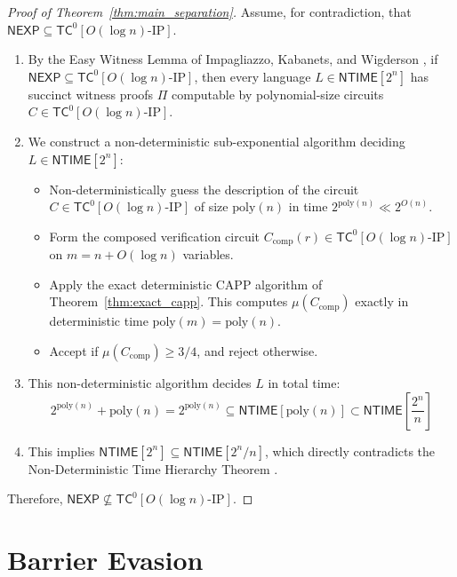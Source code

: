 \documentclass[11pt,letterpaper]{article}
\newcommand{\NEXP}{\mathsf{NEXP}}
\newcommand{\NTIME}{\mathsf{NTIME}}
\newcommand{\TC}{\mathsf{TC}}
\newcommand{\poly}{\mathrm{poly}}
\begin{document}
\begin{proof}[Proof of Theorem~\ref{thm:main_separation}]
Assume, for contradiction, that $\NEXP \subseteq \TC^0[O(\log n)\text{-}\mathrm{IP}]$.
\begin{enumerate}
    \item By the Easy Witness Lemma of Impagliazzo, Kabanets, and Wigderson \cite{IKW02}, if $\NEXP \subseteq \TC^0[O(\log n)\text{-}\mathrm{IP}]$, then every language $L \in \NTIME[2^n]$ has succinct witness proofs $\Pi$ computable by polynomial-size circuits $C \in \TC^0[O(\log n)\text{-}\mathrm{IP}]$.
    \item We construct a non-deterministic sub-exponential algorithm deciding $L \in \NTIME[2^n]$:
    \begin{itemize}
        \item Non-deterministically guess the description of the circuit $C \in \TC^0[O(\log n)\text{-}\mathrm{IP}]$ of size $\poly(n)$ in time $2^{\poly(n)} \ll 2^{O(n)}$.
        \item Form the composed verification circuit $C_{\mathrm{comp}}(r) \in \TC^0[O(\log n)\text{-}\mathrm{IP}]$ on $m = n + O(\log n)$ variables.
        \item Apply the exact deterministic CAPP algorithm of Theorem~\ref{thm:exact_capp}. This computes $\mu(C_{\mathrm{comp}})$ exactly in deterministic time $\poly(m) = \poly(n)$.
        \item Accept if $\mu(C_{\mathrm{comp}}) \ge 3/4$, and reject otherwise.
    \end{itemize}
    \item This non-deterministic algorithm decides $L$ in total time:
    \[
    2^{\poly(n)} + \poly(n) = 2^{\poly(n)} \subseteq \NTIME[\poly(n)] \subset \NTIME\left[\frac{2^n}{n}\right]
    \]
    \item This implies $\NTIME[2^n] \subseteq \NTIME[2^n / n]$, which directly contradicts the Non-Deterministic Time Hierarchy Theorem \cite{Coo72,Zak83}.
\end{enumerate}
Therefore, $\NEXP \not\subseteq \TC^0[O(\log n)\text{-}\mathrm{IP}]$.
\end{proof}

\section{Barrier Evasion}
\end{document}
